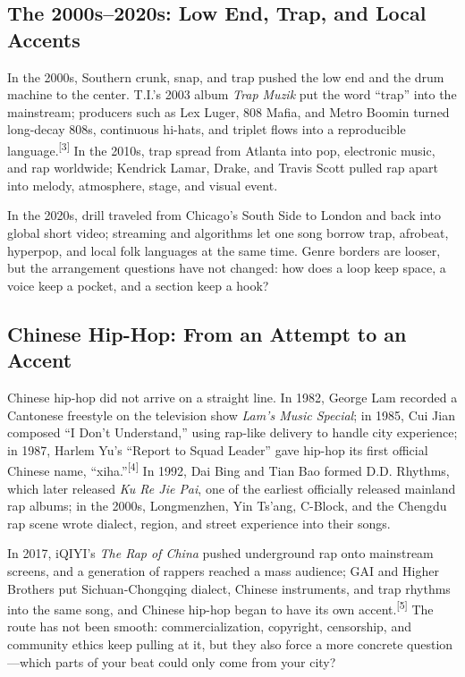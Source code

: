 \subsection{The 2000s--2020s: Low End, Trap, and Local Accents}
\label{sec:hiphop-history-2000s}

In the 2000s, Southern crunk, snap, and trap pushed the low end and the drum machine to the center. T.I.'s 2003 album \emph{Trap Muzik} put the word ``trap'' into the mainstream; producers such as Lex Luger, 808 Mafia, and Metro Boomin turned long-decay 808s, continuous hi-hats, and triplet flows into a reproducible language.{\textsuperscript{[3]}} In the 2010s, trap spread from Atlanta into pop, electronic music, and rap worldwide; Kendrick Lamar, Drake, and Travis Scott pulled rap apart into melody, atmosphere, stage, and visual event.

In the 2020s, drill traveled from Chicago's South Side to London and back into global short video; streaming and algorithms let one song borrow trap, afrobeat, hyperpop, and local folk languages at the same time. Genre borders are looser, but the arrangement questions have not changed: how does a loop keep space, a voice keep a pocket, and a section keep a hook?

\subsection{Chinese Hip-Hop: From an Attempt to an Accent}
\label{sec:hiphop-history-china}

Chinese hip-hop did not arrive on a straight line. In 1982, George Lam recorded a Cantonese freestyle on the television show \emph{Lam's Music Special}; in 1985, Cui Jian composed ``I Don't Understand,'' using rap-like delivery to handle city experience; in 1987, Harlem Yu's ``Report to Squad Leader'' gave hip-hop its first official Chinese name, ``xiha.''{\textsuperscript{[4]}} In 1992, Dai Bing and Tian Bao formed D.D. Rhythms, which later released \emph{Ku Re Jie Pai}, one of the earliest officially released mainland rap albums; in the 2000s, Longmenzhen, Yin Ts'ang, C-Block, and the Chengdu rap scene wrote dialect, region, and street experience into their songs.

In 2017, iQIYI's \emph{The Rap of China} pushed underground rap onto mainstream screens, and a generation of rappers reached a mass audience; GAI and Higher Brothers put Sichuan-Chongqing dialect, Chinese instruments, and trap rhythms into the same song, and Chinese hip-hop began to have its own accent.{\textsuperscript{[5]}} The route has not been smooth: commercialization, copyright, censorship, and community ethics keep pulling at it, but they also force a more concrete question---which parts of your beat could only come from your city?

